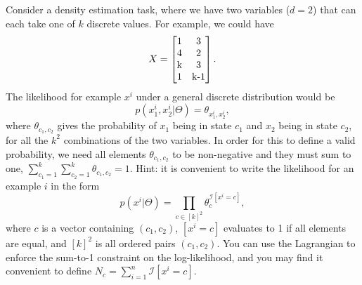 \documentclass{article}
\begin{document}
Consider a density estimation task, where we have two variables ($d=2$) that can each take one of $k$ discrete values. For example, we could have
\[
X = \mat{1 & 3\\4 & 2\\ $k$ & 3\\1 & $k-1$}.
\]
The likelihood for example $x^i$ under a general discrete distribution would be
\[
p(x^i_1, x^i_2 | \Theta) = \theta_{x_1^i,x_2^i},
\]
where $\theta_{c_1,c_2}$ gives the probability of $x_1$ being in state $c_1$ and $x_2$ being in state $c_2$, for all the $k^2$ combinations of the two variables. In order for this to define a valid probability, we need all elements $\theta_{c_1,c_2}$ to be non-negative and they must sum to one, $\sum_{c_1=1}^k\sum_{c_2=1}^k \theta_{c_1,c_2} = 1$.
Hint: it is convenient to write the likelihood for an example $i$ in the form
\[
p(x^i | \Theta) = \prod_{c \in [k]^2}\theta_c^{\mathcal{I}[x^i = c]},
\]
where $c$ is a vector containing $(c_1,c_2)$, $[x^i = c]$ evaluates to 1 if all elements are equal, and $[k]^2$ is all ordered pairs $(c_1,c_2)$. You can use the Lagrangian to enforce the sum-to-1 constraint on the log-likelihood, and you may find it convenient to define $N_c = \sum_{i=1}^n \mathcal{I}[x^i = c]$.


\end{document}
